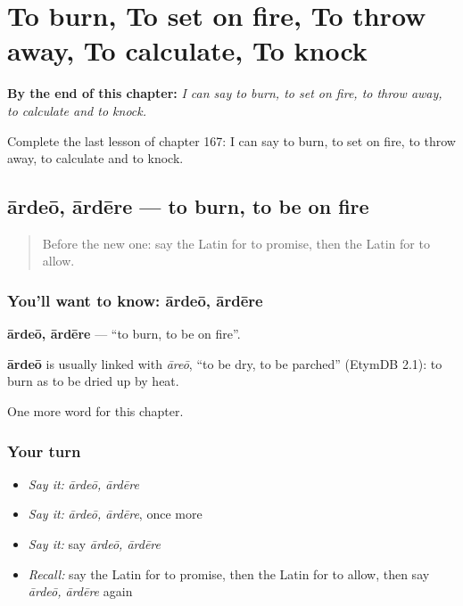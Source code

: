 
\chapter{To burn, To set on fire, To throw away, To calculate, To knock}
\label{ch:la-to-burn-to-set-on-fire-to-throw-away-to-calculate-to-knock}

\begin{chapteropening}
\textbf{By the end of this chapter:} \emph{I can say to burn, to set on fire, to throw away, to calculate and to knock.}

Complete the last lesson of chapter 167: I can say to burn, to set on fire, to throw away, to calculate and to knock.
\end{chapteropening}

\section[ārdeō, ārdēre]{ārdeō, ārdēre — to burn, to be on fire}

\label{lesson:LA-C167-ardeo}



\begin{quote}
Before the new one: say the Latin for to promise, then the Latin for to allow.
\end{quote}

\subsection*{You'll want to know: ārdeō, ārdēre}
\textbf{ārdeō, ārdēre} — \textquotedblleft{}to burn, to be on fire\textquotedblright{}.

\begin{cousinweb}
\textbf{ārdeō} is usually linked with \emph{āreō}, \textquotedblleft{}to be dry, to be parched\textquotedblright{} (EtymDB 2.1): to burn as to be dried up by heat.
\end{cousinweb}

\begin{grammarlens}[title={What you've built}]
One more word for this chapter.
\end{grammarlens}

\subsection*{Your turn}
\begin{itemize}
\raggedright
  \item \emph{Say it:} \emph{ārdeō, ārdēre}
  \item \emph{Say it:} \emph{ārdeō, ārdēre}, once more
  \item \emph{Say it:} say \emph{ārdeō, ārdēre}
  \item \emph{Recall:} say the Latin for to promise, then the Latin for to allow, then say \emph{ārdeō, ārdēre} again
\end{itemize}

